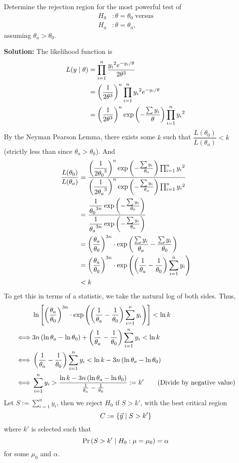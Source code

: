 Determine the rejection region for the most powerful test of
\begin{align*} H_0 &: \theta = \theta_0\;\text{versus} \\ H_a &: \theta = \theta_a, \end{align*} assuming $\theta_a > \theta_0$.

\nl \textbf{Solution: } The likelihood function is
\begin{align*}
    L(y \mid \theta) &= \prod_{i=1}^n \dfrac{{y_i}^2e^{-y_i/\theta}}{2\theta^3} \\
    &= \left( \dfrac{{1}}{{2\theta^3}} \right)^n \prod_{i=1}^n {y_i}^2 e^{-y_i/\theta}\\
    &= \left( \dfrac{{1}}{{2\theta^3}} \right)^n \exp \left( { - \frac{\sum y_i}{\theta}} \right) \prod_{i=1}^n {y_i}^2
\end{align*}
By the Neyman Pearson Lemma, there exists some $k$ such that $\dfrac{L(\theta_0)}{L(\theta_a)} < k$ (strictly less than since $\theta_a > \theta_0$). And 
\begin{align*}
    \dfrac{L(\theta_0)}{L(\theta_a)} &= \dfrac{
        \left( \dfrac{{1}}{{2{\theta_0}^3}} \right)^n \exp \left( { - \frac{\sum y_i}{\theta_0}} \right) \prod_{i=1}^n {y_i}^2
    } {
        \left( \dfrac{{1}}{{2{\theta_a}^3}} \right)^n \exp \left( { - \frac{\sum y_i}{\theta_a}} \right) \prod_{i=1}^n {y_i}^2
    }\\ 
    &= \dfrac{
        \dfrac{1}{{\theta_0}^{3n}} \exp \left( { - \frac{\sum y_i}{\theta_0}} \right)
    } {
        \dfrac{1}{{\theta_a}^{3n}} \exp \left( { - \frac{\sum y_i}{\theta_a}} \right)
    }\\ 
    &= \left( \dfrac{{\theta_a}}{{\theta_0}} \right)^{3n}  \cdot 
        \exp \left( { \frac{\sum y_i}{\theta_a} - \frac{\sum y_i}{\theta_0}} \right)
        \\
    &= \left( \dfrac{{\theta_a}}{{\theta_0}} \right)^{3n}  \cdot 
    \exp \left( {\left( {\frac{1}{{\theta_a}} - \frac{1}{{\theta_0}} } \right) \sum_{i=1}^n y_i } \right)
    \\
    &< k
\end{align*}
To get this in terms of a statistic, we take the natural log of both sides. Thus,
\begin{align*}
    & \ln \left[ { \left( \dfrac{{\theta_a}}{{\theta_0}} \right)^{3n}  \cdot 
    \exp \left( {\left( {\frac{1}{{\theta_a}} - \frac{1}{{\theta_0}} } \right) \sum_{i=1}^n y_i } \right) } \right] < \ln k\\
    \iff & 3n \left( { \ln \theta_a - \ln \theta_0} \right) + \left( {\frac{1}{{\theta_a}} - \frac{1}{{\theta_0}} } \right) \sum_{i=1}^n y_i < \ln k\\
    \iff & \left( {\frac{1}{{\theta_a}} - \frac{1}{{\theta_0}} } \right) \sum_{i=1}^n y_i < \ln k - 3n \left( { \ln \theta_a - \ln \theta_0} \right)\\
    \iff & \sum_{i=1}^n y_i > \frac{ \ln k - 3n \left( { \ln \theta_a - \ln \theta_0} \right) }{\frac{1}{{\theta_a}} - \frac{1}{{\theta_0}} } := k' \tag{Divide by negative value}\\
\end{align*}
Let $S := \displaystyle \sum_{i=1}^n y_i$, then we reject $H_0$ if $S > k'$, with the best critical region
$$C := \left\{{\vec{y} \mid S > k'}\right\}$$
where $k'$ is selected such that
$$\Pr \left( {S > k' \mid H_0 : \mu = \mu_0 } \right) = \alpha$$
for some $\mu_0$ and $\alpha$.